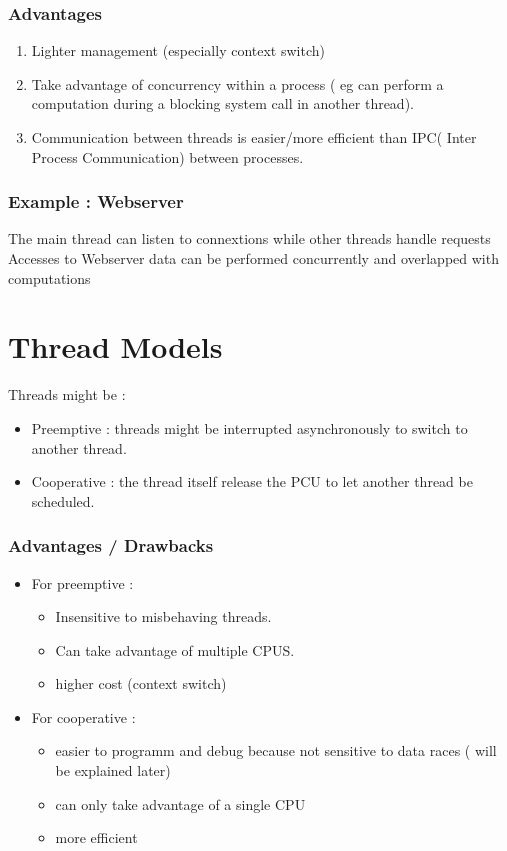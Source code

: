\documentclass[a4paper,10pt]{article}
\begin{document}
\subsubsection*{Advantages}
\begin{enumerate}[label=-]
	\item Lighter management (especially context switch)
	\item Take advantage of concurrency within a process ( eg can perform a computation during a blocking system call in another thread).
	\item Communication between threads is easier/more efficient than IPC( Inter Process Communication) between processes.
\end{enumerate}

\subsubsection*{Example : Webserver}
The main thread can listen to connextions while other threads handle requests
Accesses to Webserver data can be performed concurrently and overlapped with computations

\section{Thread Models}

Threads might be :
\begin{itemize}
\item Preemptive : threads might be interrupted asynchronously to switch to another thread. 
\item Cooperative : the thread itself release the PCU to let another thread be scheduled.
\end{itemize}

\subsubsection*{Advantages / Drawbacks}

\begin{itemize}
 \item For preemptive :
\begin{itemize} 
\item Insensitive to misbehaving threads.
\item Can take advantage of multiple CPUS.
\item higher cost (context switch) 
\end{itemize}

\item For cooperative :
 \begin{itemize}
 
\item easier to programm and debug  because not sensitive to data races ( will be explained later) 
\item can only take advantage of a single CPU 
\item more efficient
\end{itemize}
\end{itemize}
\end{document}
